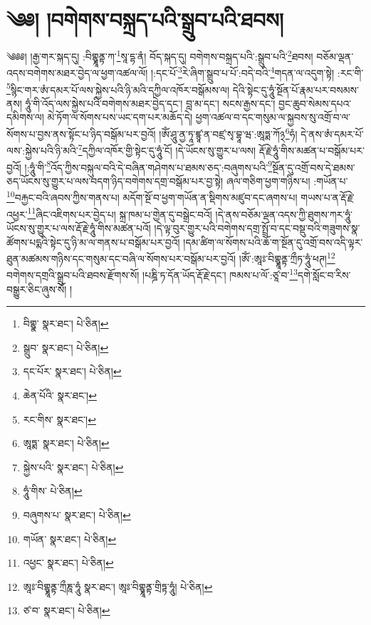 \setcounter{footnote}{0} 
\chapter{༄༅། །བགེགས་བསྐྲད་པའི་སྒྲུབ་པའི་ཐབས།}༄༅༅། །རྒྱ་གར་སྐད་དུ། :བིགྷྣཱནྟ་ཀ་\footnote{བིགྷྣ་  སྣར་ཐང་།  པེ་ཅིན། }སཱ་དྷ་ནཾ། བོད་སྐད་དུ། བགེགས་བསྐྲད་པའི་:སྒྲུབ་པའི་\footnote{སྒྲུབ་  སྣར་ཐང་།  པེ་ཅིན། }ཐབས། བཅོམ་ལྡན་འདས་བགེགས་མཐར་བྱེད་ལ་ཕྱག་འཚལ་ལོ། །:དང་པོ་\footnote{དང་པོར་  སྣར་ཐང་།  པེ་ཅིན། }རེ་ཞིག་སྒྲུབ་པ་པོ་:བདེ་བའི་\footnote{ཆེན་པོའི་  སྣར་ཐང་། }གདན་ལ་འདུག་སྟེ། :རང་གི་\footnote{རང་གིས་  སྣར་ཐང་། }སྙིང་གར་ཨཾ་དམར་པོ་ལས་སྐྱེས་པའི་ཉི་མའི་དཀྱིལ་འཁོར་བསྒོམས་ལ། དེའི་སྟེང་དུ་ཧཱུཾ་སྔོན་པོ་རྣམ་པར་བསམས་ནས། ཧཱུཾ་གི་འོད་ལས་སྐྱེས་པའི་བགེགས་མཐར་བྱེད་དང་། བླ་མ་དང་། སངས་རྒྱས་དང་། བྱང་ཆུབ་སེམས་དཔའ་དམིགས་ལ། མེ་ཏོག་ལ་སོགས་པས་ཡང་དག་པར་མཆོད་དེ། ཕྱག་འཚལ་བ་དང་གསུམ་ལ་སྐྱབས་སུ་འགྲོ་བ་ལ་སོགས་པ་བྱས་ནས་སྟོང་པ་ཉིད་བསྒོམ་པར་བྱའོ། །ཨོཾ་ཤཱུ་ནྱ་ཏཱ་ཛྙཱ་ན་བཛྲ་སྭ་བྷཱ་ཝ་:ཨཱཏྨ་ཀོ྅\footnote{ཨཱཏྨ་  སྣར་ཐང་།  པེ་ཅིན། }ཧཾ། དེ་ནས་ཨཾ་དམར་པོ་ལས་:སྐྱེས་པའི་ཉི་མའི་\footnote{སྐྱེས་པའི་  སྣར་ཐང་།  པེ་ཅིན། }དཀྱིལ་འཁོར་གྱི་སྟེང་དུ་ཧཱུཾ་ངོ། །དེ་ཡོངས་སུ་གྱུར་པ་ལས། རྡོ་རྗེ་ཧཱུཾ་གིས་མཚན་པ་བསྒོམ་པར་བྱའོ། །:ཧཱུཾ་གི་\footnote{ཧཱུཾ་གིས་  པེ་ཅིན། }འོད་ཀྱིས་བསྐུལ་བའི་དེ་བཞིན་གཤེགས་པ་ཐམས་ཅད་:བཞུགས་པའི་\footnote{བཞུགས་པ་  སྣར་ཐང་།  པེ་ཅིན། }སྔོན་དུ་འགྲོ་བས་དེ་ཐམས་ཅད་ཡོངས་སུ་གྱུར་པ་ལས་བདག་ཉིད་བགེགས་དགྲ་བསྒོམ་པར་བྱ་སྟེ། ཞལ་གཅིག་ཕྱག་གཉིས་པ། :གཡོན་པ་\footnote{གཡོན་  སྣར་ཐང་།  པེ་ཅིན། }བརྐྱང་བའི་ཞབས་ཀྱིས་གནས་པ། མདོག་སྔོ་བ་ཕྱག་གཡོན་ན་སྡིགས་མཛུབ་དང་ཞགས་པ། གཡས་པ་ན་རྡོ་རྗེ་འཕྱར་\footnote{འཕྱང་  སྣར་ཐང་།  པེ་ཅིན། }ཞིང་འཇིགས་པར་བྱེད་པ། སྐྲ་ཁམ་པ་གྱེན་དུ་བསྒྲེང་བའོ། །དེ་ནས་བཅོམ་ལྡན་འདས་ཀྱི་ཐུགས་ཀར་ཧཱུཾ་ཡོངས་སུ་གྱུར་པ་ལས་རྡོ་རྗེ་ཧཱུཾ་གིས་མཚན་པའོ། །དེ་ལྟ་བུར་གྱུར་པའི་བགེགས་དགྲ་སྤྲོ་བ་དང་བསྡུ་བའི་གཟུགས་སྣ་ཚོགས་པདྨའི་སྟེང་དུ་ཉི་མ་ལ་གནས་པ་བསྒོམ་པར་བྱའོ། །དམ་ཚིག་ལ་སོགས་པའི་ཆོ་ག་སྔོན་དུ་འགྲོ་བས་འདི་ལྟར་ཐུན་མཚམས་གཉིས་དང་གསུམ་དང་བཞི་ལ་སོགས་པར་བསྒོམ་པར་བྱའོ། །ཨོཾ་:ཨཱཿ་བིགྷྣཱནྟ་ཀྲྀཏ་ཧཱུཾ་ཕཊ།\footnote{ཨཱཿ་བིགྷྣཱནྟ་ཀྲྀཎཱ་ཧཱུཾ  སྣར་ཐང་། ཨཱཿ་བིགྷྣཱནྟ་གྲིཏྟ་ཧཱུཾ།  པེ་ཅིན། } བགེགས་དགྲའི་སྒྲུབ་པའི་ཐབས་རྫོགས་སོ། །པཎྜི་ཏ་དོན་ཡོད་རྡོ་རྗེ་དང་། ཁམས་པ་ལོ་:ཙཱ་བ་\footnote{ཙ་བ་  སྣར་ཐང་།  པེ་ཅིན། }དགེ་སློང་བ་རིས་བསྒྱུར་ཅིང་ཞུས་སོ། ། 